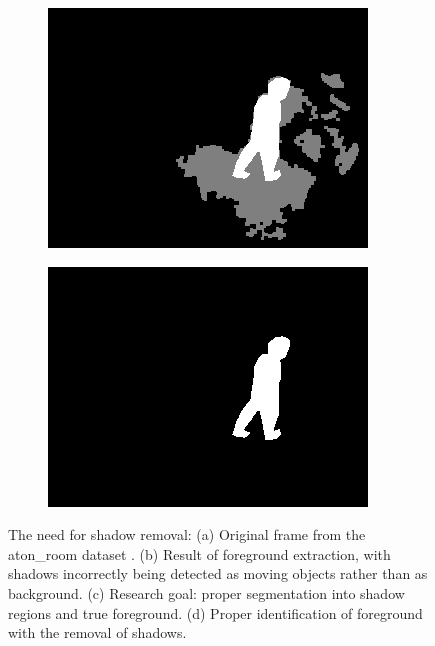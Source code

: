 \begin{figure}
\begin{subfigure}{.49\linewidth}
    \includegraphics[width=1\linewidth]{figures/background/room_0295_shadows.jpg}
    \caption{}
  \end{subfigure}
  \hfill
  \begin{subfigure}{.49\linewidth}
  \centering
    \includegraphics[width=1\linewidth]{figures/background/room_0295_clean.jpg}
    \caption{}
  \end{subfigure}
  \caption{The need for shadow removal: (a) Original frame from the aton\_room dataset \cite{aton2002}. (b) Result of foreground extraction, with shadows incorrectly being detected as moving objects rather than as background. (c) Research goal: proper segmentation into shadow regions and true foreground. (d) Proper identification of foreground with the removal of shadows.}
\label{fig:nonshadow}
\end{figure}

